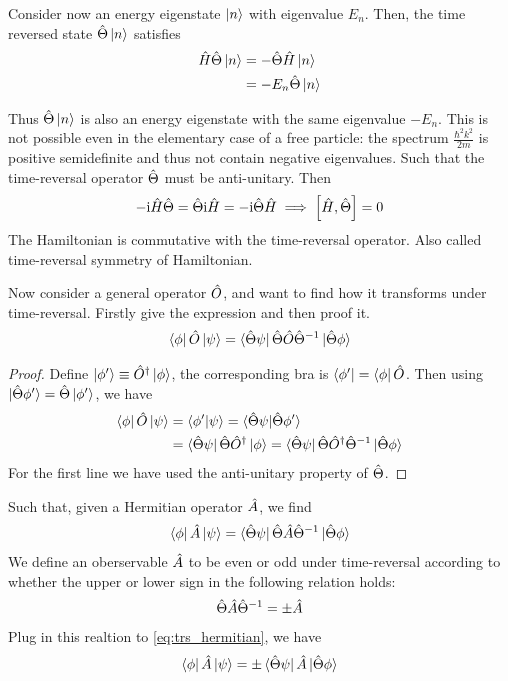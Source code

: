 Consider now an energy eigenstate $\ket n$ with eigenvalue $E_n$. Then, the time reversed state $\hat{\Theta} \ket{n}$ satisfies 
\begin{align*}
    \hat{H} \hat{\Theta} \ket{n} &= - \hat{\Theta} \hat{H} \ket{n} \notag \\
    &= - E_n \hat{\Theta} \ket{n}
\end{align*}

Thus $\hat{\Theta} \ket{n}$ is also an energy eigenstate with the same eigenvalue $-E_n$. This is not possible even in the elementary case of a free particle: the spectrum $\frac{\hbar^2 k^2 }{2m}$ is positive semidefinite and thus not contain negative eigenvalues.
Such that the time-reversal operator $\hat{\Theta}$ must be anti-unitary. Then 
\begin{align*}
    - \mathrm{i} \hat{H} \hat{\Theta} = \hat{\Theta} \mathrm{i} \hat{H} = - \mathrm{i} \hat{\Theta} \hat{H} \implies \left[ \hat{H} , \hat{\Theta} \right] = 0
\end{align*}
The Hamiltonian is commutative with the time-reversal operator. Also called time-reversal symmetry of Hamiltonian.

Now consider a general operator $\hat{O}$, and want to find how it transforms under time-reversal. Firstly give the expression and then proof it. 
\begin{align}
    \bra{\phi} \hat{O} \ket{\psi} = \bra{\hat{\Theta} \psi} \hat{\Theta} \hat{O} \hat{\Theta}^{-1} \ket{\hat{\Theta} \phi} \label{eq:time_reversal_operator_transformation} 
\end{align}
\begin{proof}
    Define $\ket{\phi'} \equiv \hat{O}^ \dag \ket{\phi}$, the corresponding bra is $\bra{\phi'} = \bra{\phi} \hat{O}$. Then using $\ket{ \hat{\Theta}\phi'} = \hat{\Theta} \ket{\phi'}$, we have
    \begin{align*}
        \bra{\phi} \hat{O} \ket{\psi} & = \braket{\phi'|\psi} = \braket{\hat{\Theta} \psi| \hat{\Theta} \phi'} \\
        &= \bra{\hat{\Theta} \psi} \hat{\Theta} \hat{O}^ \dag \ket{\phi} = \bra{\hat{\Theta} \psi} \hat{\Theta} \hat{O}^ \dag \hat{\Theta}^{-1} \ket{\hat{\Theta} \phi} 
    \end{align*}
    For the first line we have used the anti-unitary property of $\hat{\Theta}$.
\end{proof}

Such that, given a Hermitian operator $\hat{A}$, we find 
\begin{align}
    \bra{\phi} \hat{A} \ket{\psi} = \bra{\hat{\Theta} \psi} \hat{\Theta} \hat{A} \hat{\Theta}^{-1} \ket{\hat{\Theta} \phi} \label{eq:trs_hermitian}
\end{align}
We define an oberservable $\hat{A}$ to be even or odd under time-reversal according to whether the upper or lower sign in the following relation holds:
\begin{align*}
    \hat{\Theta} \hat{A} \hat{\Theta}^{-1} = \pm \hat{A}
\end{align*}
Plug in this realtion to \cref{eq:trs_hermitian}, we have
\begin{align*}
    \bra{\phi} \hat{A} \ket{\psi} = \pm \bra{\hat{\Theta} \psi} \hat{A} \ket{\hat{\Theta} \phi}
\end{align*}

